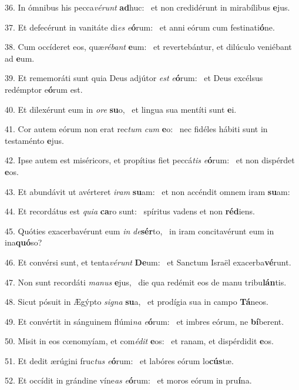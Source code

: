 36. In ómnibus his pecca\textit{vé}\textit{runt} \textbf{ad}huc: \ast\  et non credidérunt in mirabílibus \textbf{e}jus.\

37. Et defecérunt in vanitáte di\textit{es} \textit{e}\textbf{ó}rum: \ast\  et anni eórum cum festinati\textbf{ó}ne.\

38. Cum occíderet eos, quæ\textit{ré}\textit{bant} \textbf{e}um: \ast\  et revertebántur, et dilúculo veniébant ad \textbf{e}um.\

39. Et rememoráti sunt quia Deus adjútor \textit{est} \textit{e}\textbf{ó}rum: \ast\  et Deus excélsus redémptor e\textbf{ó}rum est.\

40. Et dilexérunt eum in \textit{o}\textit{re} \textbf{su}o, \ast\  et lingua sua mentíti sunt \textbf{e}i.\

41. Cor autem eórum non erat rec\textit{tum} \textit{cum} \textbf{e}o: \ast\  nec fidéles hábiti sunt in testaménto \textbf{e}jus.\

42. Ipse autem est miséricors, et propítius fiet peccá\textit{tis} \textit{e}\textbf{ó}rum: \ast\  et non dispérdet \textbf{e}os.\

43. Et abundávit ut avérteret \textit{i}\textit{ram} \textbf{su}am: \ast\  et non accéndit omnem iram \textbf{su}am:\

44. Et recordátus est \textit{qui}\textit{a} \textbf{ca}ro sunt: \ast\  spíritus vadens et non \textbf{réd}iens.\

45. Quóties exacerbavérunt eum \textit{in} \textit{de}\textbf{sér}to, \ast\  in iram concitavérunt eum in ina\textbf{quó}so?\

46. Et convérsi sunt, et tenta\textit{vé}\textit{runt} \textbf{De}um: \ast\  et Sanctum Israël exacerba\textbf{vé}runt.\

47. Non sunt recordáti \textit{ma}\textit{nus} \textbf{e}jus, \ast\  die qua redémit eos de manu tribu\textbf{lán}tis.\

48. Sicut pósuit in Ægýpto \textit{si}\textit{gna} \textbf{su}a, \ast\  et prodígia sua in campo \textbf{Tá}neos.\

49. Et convértit in sánguinem flúmi\textit{na} \textit{e}\textbf{ó}rum: \ast\  et imbres eórum, ne \textbf{bí}berent.\

50. Misit in eos cœnomyíam, et com\textit{é}\textit{dit} \textbf{e}os: \ast\  et ranam, et dispérdidit \textbf{e}os.\

51. Et dedit ærúgini fruc\textit{tus} \textit{e}\textbf{ó}rum: \ast\  et labóres eórum lo\textbf{cús}tæ.\

52. Et occídit in grándine víne\textit{as} \textit{e}\textbf{ó}rum: \ast\  et moros eórum in pru\textbf{í}na.\

